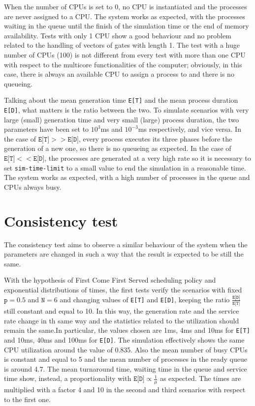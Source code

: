 When the number of CPUs is set to 0, no CPU is instantiated and the processes
are never assigned to a CPU. The system works as expected, with the processes
waiting in the queue until the finish of the simulation time or the end of
memory availability. Tests with only 1 CPU show a good behaviour and no problem
related to the handling of vectors of gates with length 1. The test with
a huge number of CPUs (100) is not different from every test with more than 
one CPU with respect to the multicore functionalities of the computer; obviously,
in this case, there is always an available CPU to assign a process to and 
there is no queueing.

Talking about the mean generation time \texttt{E[T]} and the mean process duration 
\texttt{E[D]}, what matters is the ratio between the two. To simulate scenarios
with very large (small) generation time and very small (large) process duration, the two
parameters have been set to $10^3$ms and $10^{-3}$ms respectively, and vice versa.
In the case of $\texttt{E[T]}>>\texttt{E[D]}$, every process executes its three phases 
before the generation of a new one, so there is no queueing as expected.
In the case of $\texttt{E[T]}<<\texttt{E[D]}$, the processes are generated at a very high rate
so it is necessary to set \texttt{sim-time-limit} to a small value to 
end the simulation in a reasonable time. The system works as expected, with
a high number of processes in the queue and CPUs always busy.

\section{Consistency test}
The consistency test aims to observe a similar behaviour of the system when the
parameters are changed in such a way that the result is expected to be still the same.

With the hypothesis of First Come First Served scheduling policy and 
exponential distributions of times, the first tests verify the scenarios 
with fixed $\texttt{p}=0.5$ and $\texttt{N}=6$ and changing values of \texttt{E[T]} and \texttt{E[D]}, 
keeping the ratio $\frac{\texttt{E[D]}}{\texttt{E[T]}}$ still constant and equal to 10. In this way, the generation
rate and the service rate change in th same way and the statistics related to
the utilization should remain the same.In particular, the values chosen are 1ms, 
4ms and 10ms for \texttt{E[T]} and 10ms, 40ms and 100ms for \texttt{E[D]}. 
The simulation effectively shows the same CPU utilization around the value of
0.835. Also the mean number of busy CPUs is constant and equal to 5 and the mean
number of processes in the ready queue is around 4.7. The mean turnaround time, 
waiting time in the queue and service time show, instead, a proportionality
with $\texttt{E[D]}\propto \frac{1}{\mu}$ as expected. The times are multiplied 
with a factor 4 and 10 in the second and third scenarios with respect to the first one.

